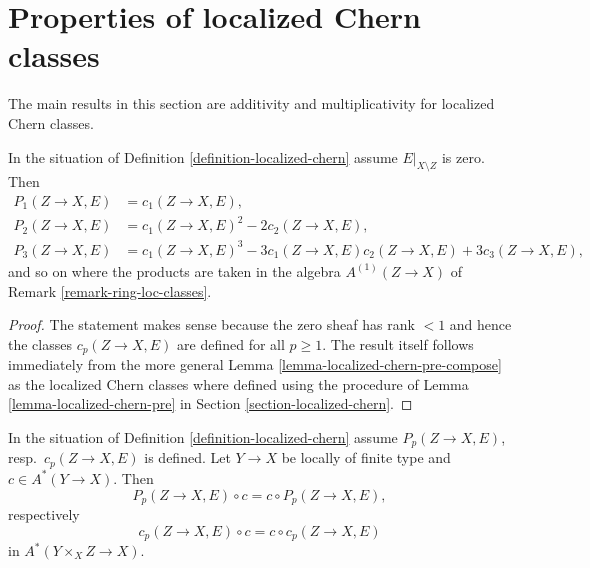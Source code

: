 \section{Properties of localized Chern classes}
\label{section-properties-loc-chern}

\noindent
The main results in this section are additivity and multiplicativity
for localized Chern classes.

\begin{lemma}
\label{lemma-loc-chern-character}
In the situation of Definition \ref{definition-localized-chern}
assume $E|_{X \setminus Z}$ is zero. Then
\begin{align*}
P_1(Z \to X, E) & = c_1(Z \to X, E), \\
P_2(Z \to X, E) & = c_1(Z \to X, E)^2 - 2c_2(Z \to X, E), \\
P_3(Z \to X, E) & = c_1(Z \to X, E)^3 - 3c_1(Z \to X, E)c_2(Z \to X, E)
+ 3c_3(Z \to X, E),
\end{align*}
and so on where the products are taken in the algebra $A^{(1)}(Z \to X)$
of Remark \ref{remark-ring-loc-classes}.
\end{lemma}

\begin{proof}
The statement makes sense because the zero sheaf has rank $< 1$ and
hence the classes $c_p(Z \to X, E)$ are defined for all $p \geq 1$.
The result itself follows immediately from the more general
Lemma \ref{lemma-localized-chern-pre-compose} as the localized Chern
classes where defined using the procedure of
Lemma \ref{lemma-localized-chern-pre}
in Section \ref{section-localized-chern}.
\end{proof}

\begin{lemma}
\label{lemma-loc-chern-classes-commute}
In the situation of Definition \ref{definition-localized-chern}
assume $P_p(Z \to X, E)$, resp.\ $c_p(Z \to X, E)$ is defined.
Let $Y \to X$ be locally of finite type and $c \in A^*(Y \to X)$.
Then
$$
P_p(Z \to X, E) \circ c = c \circ P_p(Z \to X, E),
$$
respectively
$$
c_p(Z \to X, E) \circ c = c \circ c_p(Z \to X, E)
$$
in $A^*(Y \times_X Z \to X)$.
\end{lemma}

